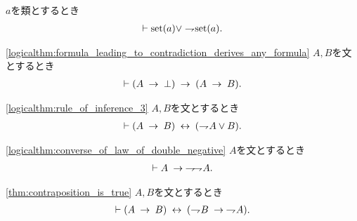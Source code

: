 	\begin{screen}
		\begin{thm}[類は集合であるか真類であるかのいずれかに定まる]
			$a$を類とするとき
			\begin{align}
				\vdash \operatorname*{set} (a) \vee \rightharpoondown\hspace{-0.25em} \operatorname*{set} (a).
			\end{align}
		\end{thm}
	\end{screen}
	
	\begin{screen}
		\begin{logicalthm}[矛盾を導く式はあらゆる式を導く]
		\ref{logicalthm:formula_leading_to_contradiction_derives_any_formula}
			$A,B$を文とするとき
			\begin{align}
				\vdash (A \hspace{0.25em}\rightarrow\hspace{0.25em} \bot) \hspace{0.25em}\rightarrow\hspace{0.25em} (A \hspace{0.25em}\rightarrow\hspace{0.25em} B).
			\end{align}
		\end{logicalthm}
	\end{screen}
	
	\begin{screen}
		\begin{logicalthm}[含意は否定と論理和で表せる]
		\ref{logicalthm:rule_of_inference_3}
			$A,B$を文とするとき
			\begin{align}
				\vdash (A \hspace{0.25em}\rightarrow\hspace{0.25em} B) \hspace{0.25em}\leftrightarrow\hspace{0.25em} (\rightharpoondown\hspace{-0.25em} A \vee B).
			\end{align}
		\end{logicalthm}
	\end{screen}
	
	\begin{screen}
		\begin{logicalthm}[二重否定の法則の逆が成り立つ]
		\ref{logicalthm:converse_of_law_of_double_negative}
			$A$を文とするとき
			\begin{align}
				\vdash A \hspace{0.25em}\rightarrow\hspace{0.25em} \rightharpoondown\hspace{-0.25em} \rightharpoondown\hspace{-0.25em} A.
			\end{align}
		\end{logicalthm}
	\end{screen}
	
	\begin{screen}
		\begin{logicalthm}[対偶命題は同値]\ref{thm:contraposition_is_true}
			$A,B$を文とするとき
			\begin{align}
				\vdash (A \hspace{0.25em}\rightarrow\hspace{0.25em} B) \hspace{0.25em}\leftrightarrow\hspace{0.25em} (\rightharpoondown\hspace{-0.25em} B \hspace{0.25em}\rightarrow\hspace{0.25em} \rightharpoondown\hspace{-0.25em} A).
			\end{align}
		\end{logicalthm}
	\end{screen}
	
